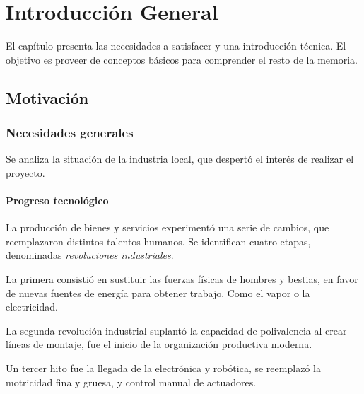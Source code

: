 \chapter{Introducción General}

\label{Chapter1} %
\label{IntroGeneral}


\newcommand{\keyword}[1]{\textbf{#1}}
\newcommand{\tabhead}[1]{\textbf{#1}}
\newcommand{\code}[1]{\texttt{#1}}
\newcommand{\file}[1]{\texttt{\bfseries#1}}
\newcommand{\option}[1]{\texttt{\itshape#1}}
\newcommand{\grados}{$^{\circ}$}


El capítulo presenta las necesidades a satisfacer y una introducción técnica. El objetivo es proveer de conceptos básicos para comprender el resto de la memoria.

\section{Motivación}
\label{motivacion}

	\subsection{Necesidades generales}
	
		Se analiza la situación de la industria local, que despertó el interés de realizar el proyecto.

		\subsubsection{Progreso tecnológico}

			La producción de bienes y servicios experimentó una serie de cambios, que reemplazaron distintos talentos humanos. Se identifican cuatro etapas, denominadas \emph{revoluciones industriales}.
		
			La primera consistió en sustituir las fuerzas físicas de hombres y bestias, en favor de nuevas fuentes de energía para obtener trabajo. Como el vapor o la electricidad. 

			La segunda revolución industrial suplantó la capacidad de polivalencia al crear líneas de montaje, fue el inicio de la organización productiva moderna.

			Un tercer hito fue la llegada de la electrónica y robótica, se reemplazó la motricidad fina y gruesa, y control manual de actuadores. 

